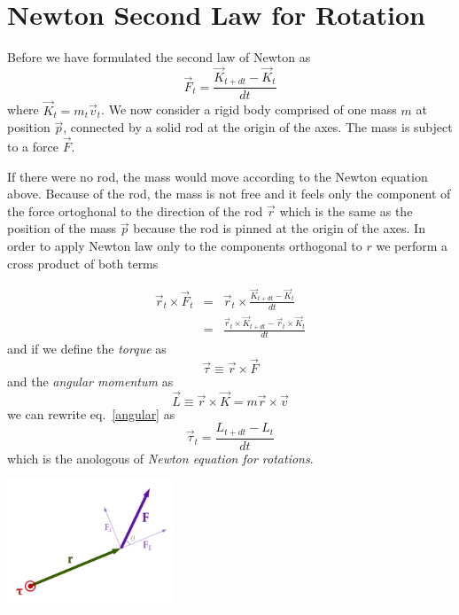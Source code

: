 \documentclass[12pt]{article}
\begin{document}
\section{Newton Second Law for Rotation}

Before we have formulated the second law of Newton as
\begin{equation}
\vec F_t = \frac{\vec K_{t+dt}-\vec K_t}{dt}
\end{equation}
where $\vec K_t = m_t \vec v_t$.
We now consider a rigid body comprised of one mass $m$ at position $\vec p$, connected by a solid rod at the origin of the axes. The mass is subject to a force $\vec F$.

If there were no rod, the mass would move according to the Newton equation above. Because of the rod, the mass is not free and it feels only the component of the force ortoghonal to the direction of the rod $\vec r$ which is the same as the position of the mass $\vec p$ because the rod is pinned at the origin of the axes. In order to apply Newton law only to the components orthogonal to $r$ we perform a cross product of both terms

\begin{eqnarray}
\vec r_t \times \vec F_t &=& \vec r_t \times \frac{\vec  K_{t+dt}-\vec  K_t}{dt} \\
&=&  \frac{\vec r_t \times\vec K_{t+dt}-\vec r_t \times \vec  K_t}{dt}
\label{angular}
\end{eqnarray}
and if we define the {\it torque} as
\begin{equation}
\vec \tau \equiv \vec r \times \vec F
\end{equation}
and the {\it angular momentum} as
\begin{equation}
\vec L \equiv \vec r \times \vec K = m  \vec r \times \vec v
\label{angular_momentum}
\end{equation}
we can rewrite eq.~\ref{angular} as 
\begin{equation}
\vec \tau_ t = \frac{L_{t+dt}-L_t}{dt}
\label{newton_rot}
\end{equation}
which is the anologous of {\it Newton equation for rotations}.

\begin{center}
\includegraphics[width=5cm]{images/torque.png}
\end{center}
\end{document}
